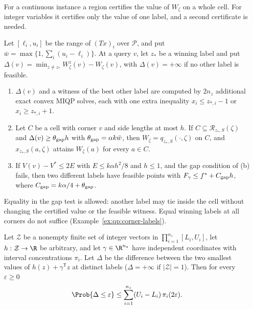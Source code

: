 For a continuous instance a region certifies the value of $W_\zeta$ on a
whole cell. For integer variables it certifies only the value of one label,
and a second certificate is needed.

\begin{lemma}\label{lem:qp:gap}
Let $[\ell_i,u_i]$ be the range of $(Tx)_i$ over $\mathcal P$, and put
$\bar w=\max\{1,\sum_i(u_i-\ell_i)\}$. At a query $v$, let $z_*$ be a winning
label and put $\Delta(v)=\min_{z\ne z_*}W^z_\zeta(v)-W_\zeta(v)$, with
$\Delta(v)=+\infty$ if no other label is feasible.
\begin{enumerate}[label=(\alph*)]
\item $\Delta(v)$ and a witness of the best other label are computed by $2n_z$
 additional exact convex MIQP solves, each with one extra inequality
 $x_i\le z_{*,i}-1$ or $x_i\ge z_{*,i}+1$.
\item Let $C$ be a cell with corner $v$ and side lengths at most $h$. If
 $C\subseteq\mathcal R_{z_*,S}(\zeta)$ and $\Delta(v)\ge\theta_{\rm gap}h$
 with $\theta_{\rm gap}=\alpha k\bar w$, then $W_\zeta=q_{z_*,S}(\cdot,\zeta)$
 on $C$, and $x_{z_*,S}(a,\zeta)$ attains $W_\zeta(a)$ for every $a\in C$.
\item If $V(v)-V^*\le2E$ with $E\le k\alpha h^2/8$ and $h\le1$, and the gap
 condition of (b) fails, then two different labels have feasible points with
 $F_\gamma\le f^*+C_{\rm gap}h$, where $C_{\rm gap}=k\alpha/4+\theta_{\rm gap}$.
\end{enumerate}
\end{lemma}

Equality in the gap test is allowed: another label may tie inside the cell
without changing the certified value or the feasible witness. Equal winning
labels at all corners do not suffice (Example~\ref{ex:qp:corner-labels}).

\begin{lemma}\label{lem:qp:isolation}
Let $\mathcal Z$ be a nonempty finite set of integer vectors in
$\prod_{i=1}^{n_z}[L_i,U_i]$, let $h:\mathcal Z\to\R$ be arbitrary, and let
$\gamma\in\R^{n_z}$ have independent coordinates with interval concentrations
$\pi_i$. Let $\Delta$ be the difference between the two smallest values of
$h(z)+\gamma^{\mathsf T} z$ at distinct labels ($\Delta=+\infty$ if
$|\mathcal Z|=1$). Then for every $\varepsilon\ge0$
\[
 \Prob\{\Delta\le\varepsilon\}\le\sum_{i=1}^{n_z}(U_i-L_i)\,\pi_i(2\varepsilon).
\]
\end{lemma}

